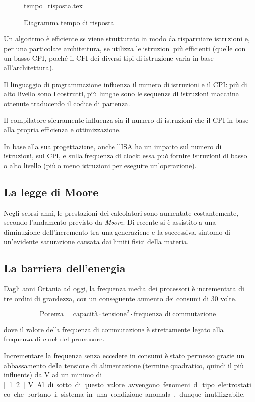 \documentclass[class=book, crop=false, oneside]{standalone}
\begin{document}
\begin{figure}[H]
	\centering
	{tempo_risposta.tex}
	\caption{Diagramma tempo di risposta}
\end{figure}

Un algoritmo è efficiente se viene strutturato in modo da risparmiare istruzioni e, per una particolare architettura, se utilizza le istruzioni più efficienti (quelle con un basso CPI, poiché il CPI dei diversi tipi di istruzione varia in base all'architettura).

Il linguaggio di programmazione influenza il numero di istruzioni e il CPI: più di alto livello sono i costrutti, più lunghe sono le sequenze di istruzioni macchina ottenute traducendo il codice di partenza.

Il compilatore sicuramente influenza sia il numero di istruzioni che il CPI in base alla propria efficienza e ottimizzazione.

In base alla sua progettazione, anche l'ISA ha un impatto sul numero di istruzioni, sul CPI, e sulla frequenza di clock: essa può fornire istruzioni di basso o alto livello (più o meno istruzioni per eseguire un'operazione).

\subsection{La legge di Moore}
Negli scorsi anni, le prestazioni dei calcolatori sono aumentate costantemente, secondo l'andamento previsto da \emph{Moore}. Di recente si è assistito a una diminuzione dell’incremento tra una generazione e la successiva, sintomo di un'evidente saturazione causata dai limiti fisici della materia.

\subsection{La barriera dell'energia}
Dagli anni Ottanta ad oggi, la frequenza media dei processori è incrementata di tre ordini di grandezza, con un conseguente aumento dei consumi di 30 volte.

\begin{equation*}
\text{Potenza} = \text{capacità} \cdot \text{tensione}^2 \cdot \text{frequenza di commutazione}
\end{equation*}

dove il valore della frequenza di commutazione è strettamente legato alla frequenza di clock del processore.

Incrementare la frequenza senza eccedere in consumi è stato permesso grazie un abbassamento della tensione di alimentazione (termine quadratico, quindi il più influente) da \unit[5]{V} ad un minimo di \unit[1.2]{V}.
Al di sotto di questo valore avvengono fenomeni di tipo elettrostatico che portano il sistema in una condizione anomala, dunque inutilizzabile.
\end{document}
